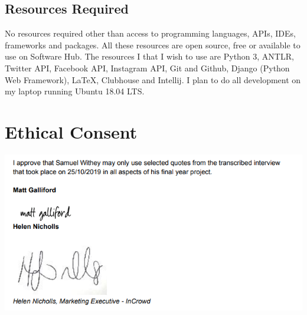 \documentclass[chapterprefix=false]{scrreprt}
\begin{document}
\subsection{Resources Required}

No resources required other than access to programming languages, APIs, IDEs, frameworks and packages. All these resources are open source, free or available to use on Software Hub. The resources I that I wish to use are Python 3, ANTLR, Twitter API, Facebook API, Instagram API, Git and Github, Django (Python Web Framework), \LaTeX, Clubhouse and Intellij. I plan to do all development on my laptop running Ubuntu 18.04 LTS.

\newpage

\section{Ethical Consent}

\includegraphics[scale=0.5]{ethical-approval}



\end{document}
